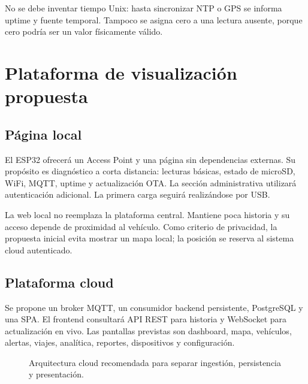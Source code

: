 \documentclass[11pt,a4paper,oneside]{report}
\begin{document}
No se debe inventar tiempo Unix: hasta sincronizar NTP o GPS se informa uptime y
fuente temporal. Tampoco se asigna cero a una lectura ausente, porque cero podría ser
un valor físicamente válido.

\chapter{Plataforma de visualización propuesta}

\section{Página local}
El ESP32 ofrecerá un Access Point y una página sin dependencias externas. Su propósito
es diagnóstico a corta distancia: lecturas básicas, estado de microSD, WiFi, MQTT,
uptime y actualización OTA. La sección administrativa utilizará autenticación
adicional. La primera carga seguirá realizándose por USB.

La web local no reemplaza la plataforma central. Mantiene poca historia y su acceso
depende de proximidad al vehículo. Como criterio de privacidad, la propuesta inicial
evita mostrar un mapa local; la posición se reserva al sistema cloud autenticado.

\section{Plataforma cloud}
Se propone un broker MQTT, un consumidor backend persistente, PostgreSQL y una SPA.
El frontend consultará API REST para historia y WebSocket para actualización en vivo.
Las pantallas previstas son dashboard, mapa, vehículos, alertas, viajes, analítica,
reportes, dispositivos y configuración.

\begin{figure}[H]
\centering
{}
\caption{Arquitectura cloud recomendada para separar ingestión, persistencia y presentación.}
\end{figure}
\end{document}
